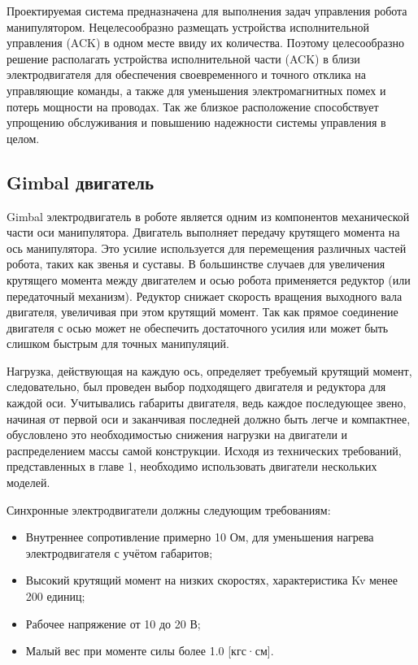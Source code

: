 Проектируемая система предназначена для выполнения задач управления  робота манипулятором. Нецелесообразно размещать устройства исполнительной управления (ACK) в одном месте ввиду их количества. Поэтому целесообразно решение располагать устройства исполнительной части (ACK) в близи электродвигателя для обеспечения своевременного и точного отклика на управляющие команды, а также для уменьшения электромагнитных помех и потерь мощности на проводах. Так же близкое расположение способствует упрощению обслуживания и повышению надежности системы управления в целом.

\subsection{Gimbal двигатель}

Gimbal электродвигатель в роботе является одним из компонентов механической части оси манипулятора. Двигатель выполняет передачу крутящего момента на ось манипулятора. Это усилие используется для перемещения различных частей робота, таких как звенья и суставы. В большинстве случаев для увеличения крутящего момента между двигателем и осью робота применяется редуктор (или передаточный механизм). Редуктор снижает скорость вращения выходного вала двигателя, увеличивая при этом крутящий момент. Так как прямое соединение двигателя с осью может не обеспечить достаточного усилия или может быть слишком быстрым для точных манипуляций. 

Нагрузка, действующая на каждую ось, определяет требуемый крутящий момент, следовательно, был проведен выбор подходящего двигателя и редуктора для каждой оси. Учитывались габариты двигателя, ведь каждое последующее звено, начиная от первой оси и заканчивая последней должно быть легче и компактнее, обусловлено это необходимостью снижения нагрузки на двигатели и распределением массы самой конструкции. Исходя из технических требований, представленных в главе 1, необходимо использовать двигатели нескольких моделей.

Синхронные электродвигатели должны  следующим требованиям:

\begin{itemize}
    \item Внутреннее сопротивление примерно 10 Ом, для уменьшения нагрева электродвигателя с учётом габаритов;
    \item Высокий крутящий момент на низких скоростях, характеристика Kv менее 200 единиц;
    \item Рабочее напряжение от 10 до 20 В;
    \item Малый вес при моменте силы более 1.0 [кгс·см].
\end{itemize}

